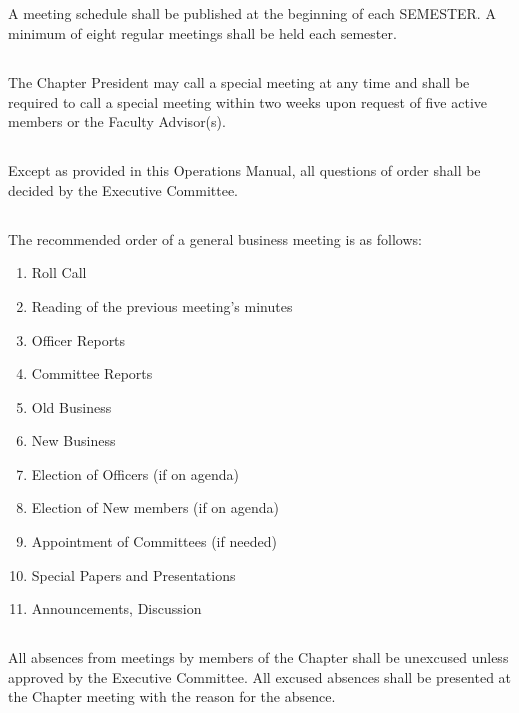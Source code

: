 \documentclass[10pt, oneside]{article}
\begin{document}
\subsection{}
A meeting schedule shall be published at the beginning of each SEMESTER. A minimum of eight regular meetings shall be held each semester.

\subsection{}
The Chapter President may call a special meeting at any time and shall be required to call a special meeting within two weeks upon request of five active members or the Faculty Advisor(s).

\subsection{}
Except as provided in this Operations Manual, all questions of order shall be decided by the Executive Committee.

\subsection{}
The recommended order of a general business meeting is as follows:
\begin{enumerate}[label=\alph*.]
\item Roll Call
\item Reading of the previous meeting’s minutes
\item Officer Reports
\item Committee Reports
\item Old Business
\item New Business
\item Election of Officers (if on agenda)
\item Election of New members (if on agenda)
\item Appointment of Committees (if needed)
\item Special Papers and Presentations
\item Announcements, Discussion
\end{enumerate}

\subsection{}
All absences from meetings by members of the Chapter shall be unexcused unless approved by the Executive Committee. All excused absences shall be presented at the Chapter meeting with the reason for the absence.
\end{document}
